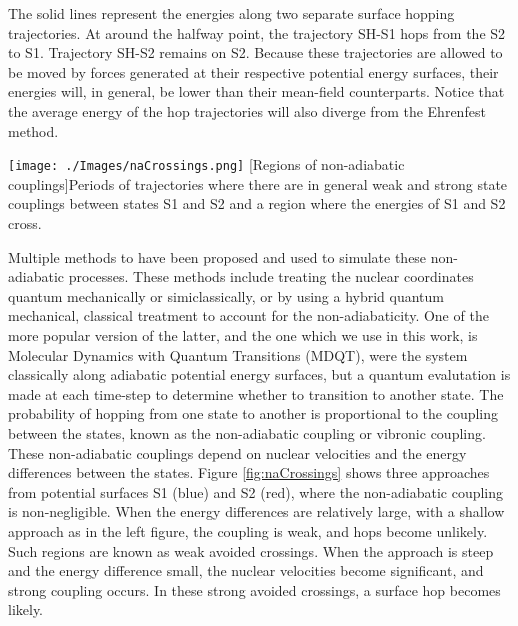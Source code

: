 The solid lines represent the energies along two separate surface hopping trajectories.
At around the halfway point, the trajectory SH-S1 hops from the S2 to S1.
Trajectory SH-S2 remains on S2.
Because these trajectories are allowed to be moved by forces generated at their respective potential energy surfaces, their energies will, in general, be lower than their mean-field counterparts.
Notice that the average energy of the hop trajectories will also diverge from the Ehrenfest method.

\noindent
\begin{minipage}[c]{\textwidth}
  \centering
  \texttt{[image: ./Images/naCrossings.png]}
  [Regions of non-adiabatic couplings]{Periods of trajectories where there are in general weak and strong state couplings between states S1 and S2 and a region where the energies of S1 and S2 cross.}
  \label{fig:naCrossings}
\end{minipage}\bigskip

Multiple methods to have been proposed and used to simulate these non-adiabatic processes.
These methods include treating the nuclear coordinates quantum mechanically or simiclassically, or by using a hybrid quantum mechanical, classical treatment to account for the non-adiabaticity.
One of the more popular version of the latter, and the one which we use in this work, is Molecular Dynamics with Quantum Transitions (MDQT), were the system  classically along adiabatic potential energy surfaces, but a quantum evalutation is made at each time-step to determine whether to transition to another state.
The probability of hopping from one state to another is proportional to the coupling between the states, known as the non-adiabatic coupling or vibronic coupling. These non-adiabatic couplings depend on nuclear velocities and the energy differences between the states. Figure \ref{fig:naCrossings} shows three approaches from potential surfaces S1 (blue) and S2 (red), where the non-adiabatic coupling is non-negligible. When the energy differences are relatively large, with a shallow approach as in the left figure, the coupling is weak, and hops become unlikely. Such regions are known as weak avoided crossings. When the approach is steep and the energy difference small, the nuclear velocities become significant, and strong coupling occurs. In these strong avoided crossings, a surface hop becomes likely.

